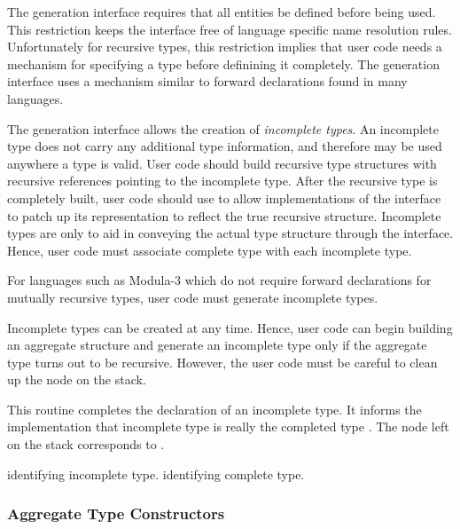 The generation interface requires that all entities be defined before
being used.  This restriction keeps the interface free of language
specific name resolution rules.  Unfortunately for recursive types,
this restriction implies that user code needs a mechanism for
specifying a type before definining it completely.  The generation
interface uses a mechanism similar to forward declarations found in
many languages.  

The generation interface allows the creation of \emph{incomplete
types}.  An incomplete type does not carry any additional type
information, and therefore may be used anywhere a type is valid.  User
code should build recursive type structures with recursive references
pointing to the incomplete type.  After the recursive type is
completely built, user code should use  to
allow implementations of the interface to patch up its representation
to reflect the true recursive structure.  Incomplete types are only to
aid in conveying the actual type structure through the interface.
Hence, user code must associate complete type with each incomplete
type.

For languages such as Modula-3 which do not require forward
declarations for mutually recursive types, user code must generate
incomplete types.  

Incomplete types can be created at any time.  Hence, user code can
begin building an aggregate structure and generate an incomplete type
only if the aggregate type turns out to be recursive.  However, the
user code must be careful to clean up the  node on the stack.

\begin{functionality}
This routine completes the declaration of an incomplete type.  It
informs the implementation that incomplete type  is really
the completed type .  The  node left on the stack
corresponds to .
\begin{Parameters}
  identifying incomplete type.
  identifying complete type.
\end{Parameters}
\end{functionality}

\subsubsection{Aggregate Type Constructors}

